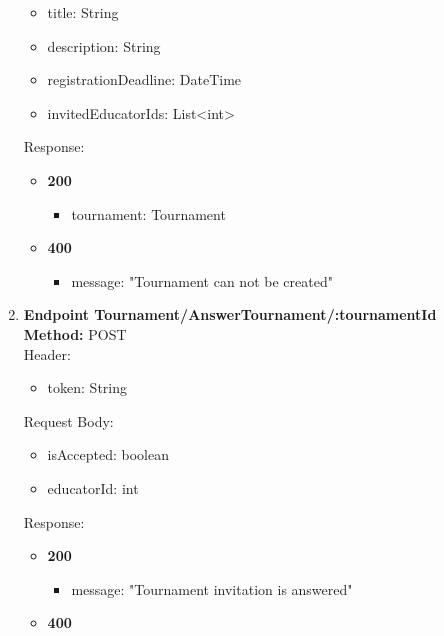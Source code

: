 \begin{enumerate}
    \begin{itemize}
        \item title: String
        \item description: String
        \item registrationDeadline: DateTime
        \item invitedEducatorIds: List<int>
    \end{itemize}
    Response:\\
    \begin{itemize}
        \item \textbf{200} \\
        \begin{itemize}
            \item tournament: Tournament
        \end{itemize}
        \item \textbf{400} \\
        \begin{itemize}
            \item message: "Tournament can not be created"
        \end{itemize}
    \end{itemize}
    \item \textbf{Endpoint Tournament/AnswerTournament/:tournamentId} \\
    \textbf{Method:} POST \\
    Header:\\
    \begin{itemize}
        \item token: String
    \end{itemize}
    Request Body:\\
    \begin{itemize}
        \item isAccepted: boolean
        \item educatorId: int
    \end{itemize}
    Response:\\
    \begin{itemize}
        \item \textbf{200} \\
        \begin{itemize}
            \item message: "Tournament invitation is answered"
        \end{itemize}
        \item \textbf{400} \\

\end{itemize}
\end{enumerate}

